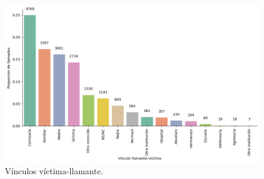 \documentclass[10 pt]{article}
\begin{document}
\begin{figure}[H]
\begin{center}
\includegraphics[scale=.5]{images/latex_vinculo_llamante.png}
\caption{Vínculos víctima-llamante.}
\label{vinculollamante}
\end{center}
\end{figure}
\end{document}
